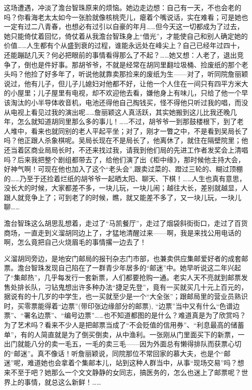 \par 这场遭遇，冲淡了澹台智珠原来的烦恼。她边走边想：自己有一天，不也会老的吗？你看海老太太如今一张脸就像核桃壳儿，瘪着个嘴说话，实在难看；可是她也一定有过二八青春，也想必有过引以自豪的年月……但今天这一切都成为了过去，她只能倚仗着回忆，倚仗着从我澹台智珠身上“借光”，才能使自己和别人确定她的价值……人生都有个从盛到衰的过程，谁能永远处在峰尖上？自己已经年过四十，还能蹦跶几天？何必把眼前的事情看得那么了不起？……她又想：人老了，退出竞争了，倒也是件好事。那胡爷爷，不就是经常在胡同里翻垃圾桶、捡废纸的那个老头吗？他捡了好多年了，听说他就靠卖那捡来的废纸为生——对了，听同院詹丽颖说过，他有儿子，但儿子儿媳妇对他都不好，让他一个人住在一间只有四平方米大的小屋里；儿子屋里有电视，却不欢迎他去看，嫌他身上有味儿，只给了他一个早该淘汰的小半导体收音机，电池还得他自己掏钱买，怪不得他只听过我的唱，而没从电视上看见过我的演出呢……詹丽颖这人真活跃，其实她搬到这儿比我还晚几年，怎么就知道胡同里那么多的事儿！……不过，胡爷爷一到那鼓楼根下，到了老人堆中，看来也就同别的老人平起平坐；对了，刚才一瞥之中，不是看到吴局长了吗？他正跟人杀象棋呢。吴局长现在不是局长了，他离休了，就住在隔壁院里；他还当着区商业局局长时，不还来找过我，请我到他们局的先进工作者发奖会上清唱吗？后来我把整个剧组都带去了，给他们演了出《柜中缘》，那时候他主持大会，好神气啊！可现在他也加入了这个“老头会”,跟卖过菜的、蹬过三轮的、糊过顶棚的……乃至于还捡着烂纸的胡爷爷一起晒太阳、聊天、下棋！……人生也真有意思，没长大的时候，大家都差不多，一块儿玩，一块儿闹；越往大长，差别就越显，人跟人就竞争上了；可到老了的时候，瞧，就又能差不多了，又一块儿玩，一块儿聊……
\par 澹台智珠这么胡思乱想着，走过了“马凯餐厅”，走过了烟袋斜街街口，走过了百货商场，一直走到义溜胡同边上了，才猛地清醒过来——啊，我是来找公用电话的啊，怎么竟把自己火烧眉毛的事情撂一边去了！
\par 义溜胡同旁边，是地安门邮局的报刊杂志门市部，也兼卖供应集邮爱好者的成套邮票。澹台智珠发现自己陷在了一群青少年居多的“邮迷”中。她早听说这二年兴起了“集邮热”，几乎每发行一套新票，人们都要抢购一通。老实人天不亮就到邮票发售处排长队，刁钻鬼想出许多种办法“捷足先登”，竟有一买就买几十元上百元的，据说有的十几岁的中学生，也一买就至少是一个“大全张”；跟邮局里的营业员熟识时，买零票能得着“边票”(带印张边缘部分的邮票), “边票”当中又有什么“色谱边票”、“署名边票”、“编号边票”……也不知道都图的是什么？难道真是为了欣赏吗？为了艺术吗？看来不少人是把邮票当成了“不会贬值的信用券”、“利息最高的储蓄单”，有的人简直就是为了倒买倒卖，从中渔利。一张刚从门里面买下的新票，一出门就能八分的卖一毛五，一毛的卖三毛——因为外面总有懒得排队而获票心切的“邮迷”。真不像话！听詹丽颖说，同院那位不常回家的慕大夫，也是个“邮迷”呢，难道她也会拿着个集邮本儿，站到这种人群当中，从事“现场交易”吗？想来不至于吧？她那么一个文文静静的女同志，搞医务的，怎么也迷上了邮票呢？世界上的事情，就总这么新鲜！……
